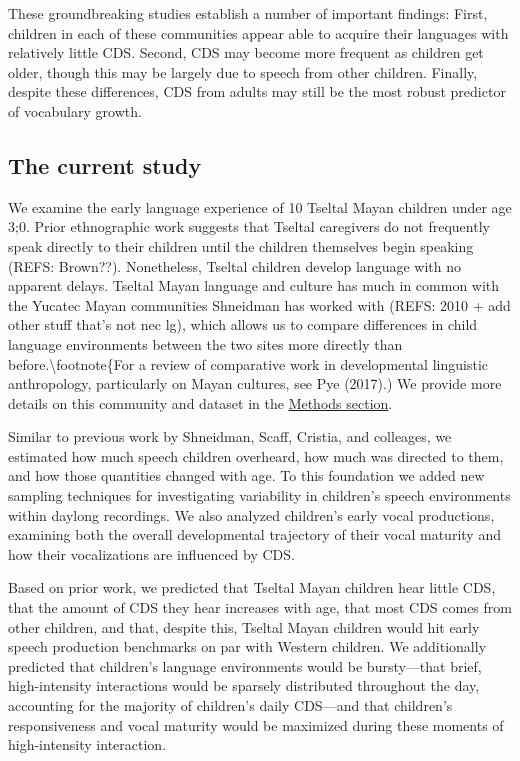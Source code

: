 \documentclass[man]{apa6}
\theoremstyle{definition}
\theoremstyle{definition}
\theoremstyle{definition}
\theoremstyle{remark}
\begin{document}
These groundbreaking studies establish a number of important findings:
First, children in each of these communities appear able to acquire
their languages with relatively little CDS. Second, CDS may become more
frequent as children get older, though this may be largely due to speech
from other children. Finally, despite these differences, CDS from adults
may still be the most robust predictor of vocabulary growth.

\subsection{The current study}\label{intro-currentstudy}

We examine the early language experience of 10 Tseltal Mayan children
under age 3;0. Prior ethnographic work suggests that Tseltal caregivers
do not frequently speak directly to their children until the children
themselves begin speaking (REFS: Brown??). Nonetheless, Tseltal children
develop language with no apparent delays. Tseltal Mayan language and
culture has much in common with the Yucatec Mayan communities Shneidman
has worked with (REFS: 2010 + add other stuff that's not nec lg), which
allows us to compare differences in child language environments between
the two sites more directly than before.\textbackslash{}footnote\{For a
review of comparative work in developmental linguistic anthropology,
particularly on Mayan cultures, see Pye (2017).) We provide more details
on this community and dataset in the \protect\hyperlink{methods}{Methods
section}.

Similar to previous work by Shneidman, Scaff, Cristia, and colleages, we
estimated how much speech children overheard, how much was directed to
them, and how those quantities changed with age. To this foundation we
added new sampling techniques for investigating variability in
children's speech environments within daylong recordings. We also
analyzed children's early vocal productions, examining both the overall
developmental trajectory of their vocal maturity and how their
vocalizations are influenced by CDS.

Based on prior work, we predicted that Tseltal Mayan children hear
little CDS, that the amount of CDS they hear increases with age, that
most CDS comes from other children, and that, despite this, Tseltal
Mayan children would hit early speech production benchmarks on par with
Western children. We additionally predicted that children's language
environments would be bursty---that brief, high-intensity interactions
would be sparsely distributed throughout the day, accounting for the
majority of children's daily CDS---and that children's responsiveness
and vocal maturity would be maximized during these moments of
high-intensity interaction.
\end{document}

